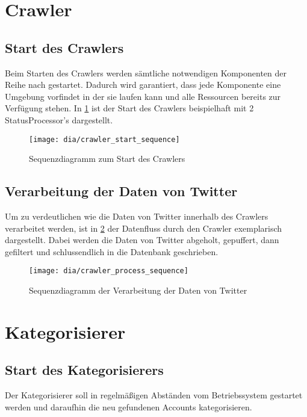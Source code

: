 \section{Crawler}

\subsection{Start des Crawlers}
Beim Starten des Crawlers werden sämtliche notwendigen Komponenten der Reihe nach gestartet. Dadurch wird garantiert, dass jede Komponente eine Umgebung vorfindet in der sie laufen kann und alle Ressourcen bereits zur Verfügung stehen. In \cref{fig:crawler_start} ist der Start des Crawlers beispielhaft mit 2 StatusProcessor's dargestellt.

\begin{figure}[htb]
\texttt{[image: dia/crawler\_start\_sequence]}
\caption{Sequenzdiagramm zum Start des Crawlers}
\label{fig:crawler_start}
\end{figure}

\subsection{Verarbeitung der Daten von Twitter}
Um zu verdeutlichen wie die Daten von Twitter innerhalb des Crawlers verarbeitet werden, ist in \cref{fig:crawler_process} der Datenfluss durch den Crawler exemplarisch dargestellt. Dabei werden die Daten von Twitter abgeholt, gepuffert, dann gefiltert und schlussendlich in die Datenbank geschrieben.

\begin{figure}[htb]
\texttt{[image: dia/crawler\_process\_sequence]}
\caption{Sequenzdiagramm der Verarbeitung der Daten von Twitter}
\label{fig:crawler_process}
\end{figure}

\section{Kategorisierer}

\subsection{Start des Kategorisierers}
Der Kategorisierer soll in regelmäßigen Abständen vom Betriebssystem gestartet werden und daraufhin die neu gefundenen Accounts kategorisieren.


